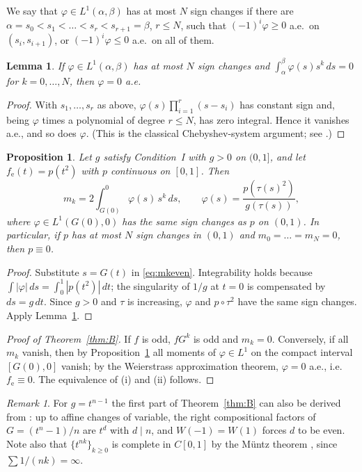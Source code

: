 \documentclass[11pt]{amsart}
\numberwithin{equation}{section}
\theoremstyle{plain}
\newtheorem{proposition}[theorem]{Proposition}
\newtheorem{lemma}[theorem]{Lemma}
\theoremstyle{definition}
\theoremstyle{remark}
\newtheorem{remark}[theorem]{Remark}
\newcommand{\fe}{f_{\mathrm e}}
\begin{document}
We say that $\varphi\in L^1(\alpha,\beta)$ has at most $N$ sign changes if
there are $\alpha=s_0<s_1<\dots<s_r<s_{r+1}=\beta$, $r\le N$, such that
$(-1)^i\varphi\ge0$ a.e.\ on $(s_i,s_{i+1})$, or $(-1)^i\varphi\le0$ a.e.\ on all
of them.

\begin{lemma}\label{lem:sign}
If $\varphi\in L^1(\alpha,\beta)$ has at most $N$ sign changes and
$\int_\alpha^\beta\varphi(s)s^k\,ds=0$ for $k=0,\dots,N$, then $\varphi=0$
a.e.
\end{lemma}

\begin{proof}
With $s_1,\dots,s_r$ as above, $\varphi(s)\prod_{i=1}^r(s-s_i)$ has constant sign
and, being $\varphi$ times a polynomial of degree $r\le N$, has zero integral. Hence
it vanishes a.e., and so does $\varphi$. (This is the classical Chebyshev-system
argument; see \cite{Kar68,PS76}.)
\end{proof}

\begin{proposition}\label{prop:reduction}
Let $g$ satisfy Condition~I with $g>0$ on $(0,1]$, and let $\fe(t)=p(t^2)$ with
$p$ continuous on $[0,1]$. Then
\[
 m_k=2\int_{G(0)}^0\varphi(s)\,s^k\,ds,\qquad
 \varphi(s)=\frac{p(\tau(s)^2)}{g(\tau(s))},
\]
where $\varphi\in L^1(G(0),0)$ has the same sign changes as $p$ on $(0,1)$. In
particular, if $p$ has at most $N$ sign changes in $(0,1)$ and
$m_0=\dots=m_N=0$, then $p\equiv0$.
\end{proposition}

\begin{proof}
Substitute $s=G(t)$ in \eqref{eq:mkeven}. Integrability holds because
$\int|\varphi|\,ds=\int_0^1|p(t^2)|\,dt$; the singularity of $1/g$ at $t=0$ is
compensated by $ds=g\,dt$. Since $g>0$ and $\tau$ is increasing, $\varphi$ and
$p\circ\tau^2$ have the same sign changes. Apply Lemma~\ref{lem:sign}.
\end{proof}

\begin{proof}[Proof of Theorem~\ref{thm:B}]
If $f$ is odd, $fG^k$ is odd and $m_k=0$. Conversely, if all $m_k$ vanish, then by
Proposition~\ref{prop:reduction} all moments of $\varphi\in L^1$ on the compact
interval $[G(0),0]$ vanish; by the Weierstrass approximation theorem,
$\varphi=0$ a.e., i.e.\ $\fe\equiv0$. The equivalence of (i) and (ii) follows.
\end{proof}

\begin{remark}
For $g=t^{n-1}$ the first part of Theorem~\ref{thm:B} can also be derived from
\cite{PM09}: up to affine changes of variable, the right compositional factors of
$G=(t^n-1)/n$ are $t^d$ with $d\mid n$, and $W(-1)=W(1)$ forces $d$ to be even.
Note also that $\{t^{nk}\}_{k\ge0}$ is complete in $C[0,1]$ by the M\"untz theorem
\cite{BE95}, since $\sum1/(nk)=\infty$.
\end{remark}
\end{document}
